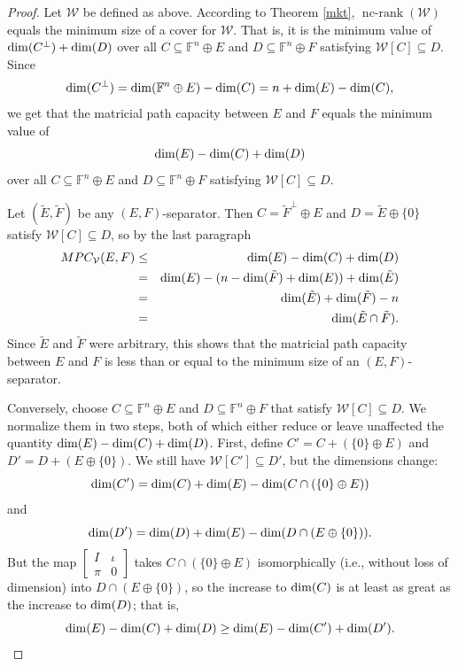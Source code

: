 \documentclass{amsart}
\theoremstyle{definition}
\newcommand\ncrank{\operatorname{nc-rank}}
\begin{document}
\begin{proof}
Let $\mathcal{W}$ be defined as above. According to Theorem \ref{mkt}, $\ncrank(\mathcal{W})$ equals the minimum size of a cover for $\mathcal{W}$. That is, it is the minimum value of ${\rm dim}(C^\perp) + {\rm dim}(D)$ over all $C \subseteq \mathbb{F}^n \oplus E$ and $D \subseteq \mathbb{F}^n \oplus F$ satisfying $\mathcal{W}[C] \subseteq D$. Since $${\rm dim}(C^\perp) = {\rm dim}(\mathbb{F}^n \oplus E) - {\rm dim}(C) = n + {\rm dim}(E) - {\rm dim}(C),$$ we get that the matricial path capacity between $E$ and $F$ equals the minimum value of $${\rm dim}(E) - {\rm dim}(C) + {\rm dim}(D)$$ over all $C \subseteq \mathbb{F}^n \oplus E$ and $D \subseteq \mathbb{F}^n \oplus F$ satisfying $\mathcal{W}[C] \subseteq D$.

Let $(\tilde{E}, \tilde{F})$ be any $(E,F)$-separator. Then $C = \tilde{F}^\perp \oplus E$ and $D = \tilde{E} \oplus \{0\}$ satisfy $\mathcal{W}[C] \subseteq D$, so by the last paragraph
\begin{eqnarray*}
MPC_{\mathcal{V}}(E,F) &\leq& {\rm dim}(E) - {\rm dim}(C) + {\rm dim}(D)\\
&=&{\rm dim}(E) - (n - {\rm dim}(\tilde{F}) + {\rm dim}(E)) + {\rm dim}(\tilde{E})\\
&=& {\rm dim}(\tilde{E}) + {\rm dim}(\tilde{F}) - n\\
&=& {\rm dim}(\tilde{E} \cap \tilde{F}).
\end{eqnarray*}
Since $\tilde{E}$ and $\tilde{F}$ were arbitrary, this shows that the matricial path capacity between $E$ and $F$ is less than or equal to the minimum size of an $(E,F)$-separator.

Conversely, choose $C \subseteq \mathbb{F}^n \oplus E$ and $D \subseteq \mathbb{F}^n \oplus F$ that satisfy $\mathcal{W}[C] \subseteq D$. We normalize them in two steps, both of which either reduce or leave unaffected the quantity ${\rm dim}(E) - {\rm dim}(C) + {\rm dim}(D)$. First, define $C' = C + (\{0\} \oplus E)$ and $D' = D + (E \oplus \{0\})$. We still have $\mathcal{W}[C'] \subseteq D'$, but the dimensions change: $${\rm dim}(C') = {\rm dim}(C) + {\rm dim}(E) - {\rm dim}(C \cap (\{0\} \oplus E))$$ and $${\rm dim}(D') = {\rm dim}(D) + {\rm dim}(E) - {\rm dim}(D \cap (E \oplus \{0\})).$$ But the map $\left[\begin{matrix}I&\iota\\ \pi&0\end{matrix}\right]$ takes $C \cap (\{0\} \oplus E)$ isomorphically (i.e., without loss of dimension) into $D \cap (E \oplus \{0\})$, so the increase to ${\rm dim}(C)$ is at least as great as the increase to ${\rm dim}(D)$; that is, $${\rm dim}(E) - {\rm dim}(C) + {\rm dim}(D) \geq {\rm dim}(E) - {\rm dim}(C') + {\rm dim}(D').$$ 


\end{proof}
\end{document}
